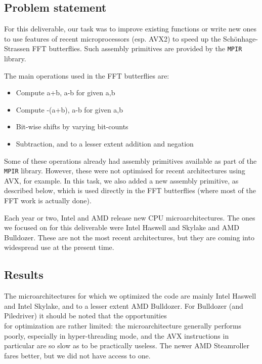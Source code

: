 \subsection{Problem statement}\label{problem-statement-1}

For this deliverable, our task was to improve existing functions or
write new ones to use features of recent microprocessors (esp. AVX2) to
speed up the Schönhage-Strassen FFT butterflies. Such assembly
primitives are provided by the \texttt{MPIR} library.

The main operations used in the FFT butterflies are:

\begin{itemize}
\tightlist
\item
  Compute a+b, a-b for given a,b
\item
  Compute -(a+b), a-b for given a,b
\item
  Bit-wise shifts by varying bit-counts
\item
  Subtraction, and to a lesser extent addition and negation
\end{itemize}

Some of these operations already had assembly primitives available as
part of the \texttt{MPIR} library. However, these were not optimised for
recent architectures using AVX, for example. In this task, we also added
a new assembly primitive, as described below, which is used directly in
the FFT butterflies (where most of the FFT work is actually done).

Each year or two, Intel and AMD release new CPU microarchitectures. The
ones we focused on for this deliverable were Intel Haswell and Skylake
and AMD Bulldozer. These are not the most recent architectures, but they
are coming into widespread use at the present time.

\subsection{Results}\label{results-1}

The microarchitectures for which we optimized the code are mainly Intel
Haswell and Intel Skylake, and to a lesser extent AMD Bulldozer. For
Bulldozer (and Piledriver) it should be noted that the opportunities\\
for optimization are rather limited: the microarchitecture generally
performs poorly, especially in hyper-threading mode, and the AVX
instructions in particular are so slow as to be practically useless. The
newer AMD Steamroller fares better, but we did not have access to one.

